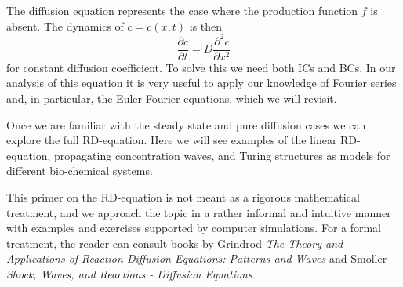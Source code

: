 The diffusion equation represents the case where the production function $f$ is 
absent. The dynamics of $c=c(x,t)$ is then
\begin{equation}
	\frac{\partial c}{\partial t} = D \frac{\partial^2 c}{\partial x^2} 
\end{equation}
for constant diffusion coefficient. To solve this we need both ICs 
and BCs. In our analysis of this equation it is very 
useful to apply our knowledge of Fourier series and, in particular,  
the Euler-Fourier equations, which we will revisit.

Once we are familiar with the steady state and pure diffusion cases we can explore the full 
RD-equation. Here we will see examples of the linear RD-equation, propagating concentration waves, and Turing 
structures as models for different bio-chemical systems.
\fi

\noindent This primer on the RD-equation is not meant as a rigorous mathematical 
treatment, and we approach the topic 
in a rather informal and intuitive manner with examples and exercises supported by computer simulations. 
For a formal treatment, the reader can consult books by 
Grindrod \emph{The Theory and Applications of Reaction Diffusion Equations: Patterns and Waves}
and Smoller \emph{Shock, Waves, and Reactions - Diffusion Equations}.  



